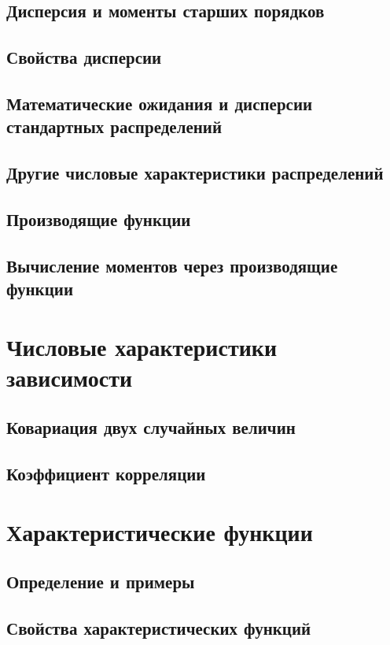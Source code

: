 \subsection{Дисперсия и моменты старших порядков}


\subsection{Свойства дисперсии}


\subsection{Математические ожидания и дисперсии стандартных распределений}


\subsection{Другие числовые характеристики распределений}


\subsection{Производящие функции}


% 

\subsection{Вычисление моментов через производящие функции}




\section{Числовые характеристики зависимости}

\subsection{Ковариация двух случайных величин}


\subsection{Коэффициент корреляции}





\section{Характеристические функции}

\subsection{Определение и примеры}


\subsection{Свойства характеристических функций}
